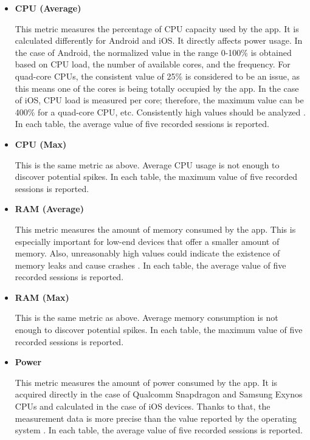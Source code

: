 \begin{itemize}
    \item \textbf{CPU (Average)}
    
    This metric measures the percentage of CPU capacity used by the app. It is calculated differently for Android and iOS. It directly affects power usage. In the case of Android, the normalized value in the range 0-100\% is obtained based on CPU load, the number of available cores, and the frequency. For quad-core CPUs, the consistent value of 25\% is considered to be an issue, as this means one of the cores is being totally occupied by the app. In the case of iOS, CPU load is measured per core; therefore, the maximum value can be 400\% for a quad-core CPU, etc. Consistently high values should be analyzed \cite{gamebench_docs_cpu}. In each table, the average value of five recorded sessions is reported.

    \bigskip

    \item \textbf{CPU (Max)}
    
    This is the same metric as above. Average CPU usage is not enough to discover potential spikes. In each table, the maximum value of five recorded sessions is reported.

    \bigskip

    \item \textbf{RAM (Average)}
    
    This metric measures the amount of memory consumed by the app. This is especially important for low-end devices that offer a smaller amount of memory. Also, unreasonably high values could indicate the existence of memory leaks and cause crashes \cite{gamebench_docs_ram}. In each table, the average value of five recorded sessions is reported.

    \bigskip

    \item \textbf{RAM (Max)}
    
    This is the same metric as above. Average memory consumption is not enough to discover potential spikes. In each table, the maximum value of five recorded sessions is reported.

    \bigskip

    \item \textbf{Power}
    
    This metric measures the amount of power consumed by the app. It is acquired directly in the case of Qualcomm Snapdragon and Samsung Exynos CPUs and calculated in the case of iOS devices. Thanks to that, the measurement data is more precise than the value reported by the operating system \cite{gamebench_docs_battery}. In each table, the average value of five recorded sessions is reported.


\end{itemize}
